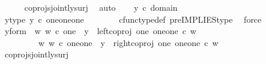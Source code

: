 \begin{isabellebody}
\ \ \ \ \isamarkupfalse%
\ coprojs{\isacharunderscore}{\kern0pt}jointly{\isacharunderscore}{\kern0pt}surj\ \isamarkupfalse%
\ auto\isanewline
\isanewline
\ \ \isamarkupfalse%
\ {\isachardoublequoteopen}y\ {\isasymin}\isactrlsub c\ domain\ {\isacharparenleft}{\kern0pt}{\isasymlangle}{\isasymt}{\isacharcomma}{\kern0pt}{\isasymt}{\isasymrangle}\ {\isasymamalg}\ {\isasymlangle}{\isasymf}{\isacharcomma}{\kern0pt}\ {\isasymf}{\isasymrangle}\ {\isasymamalg}\ {\isasymlangle}{\isasymf}{\isacharcomma}{\kern0pt}{\isasymt}{\isasymrangle}{\isacharparenright}{\kern0pt}{\isachardoublequoteclose}\ \isanewline
\ \ \isamarkupfalse%
\ \isamarkupfalse%
\ y{\isacharunderscore}{\kern0pt}type{\isacharcolon}{\kern0pt}\ {\isachardoublequoteopen}y\ {\isasymin}\isactrlsub c\ {\isacharparenleft}{\kern0pt}one{\isasymCoprod}{\isacharparenleft}{\kern0pt}one{\isasymCoprod}one{\isacharparenright}{\kern0pt}{\isacharparenright}{\kern0pt}{\isachardoublequoteclose}\ \ \isanewline
\ \ \ \ \isamarkupfalse%
\ cfunc{\isacharunderscore}{\kern0pt}type{\isacharunderscore}{\kern0pt}def\ pre{\isacharunderscore}{\kern0pt}IMPLIES{\isacharunderscore}{\kern0pt}type\ \isamarkupfalse%
\ force\isanewline
\ \ \isamarkupfalse%
\ \isamarkupfalse%
\ y{\isacharunderscore}{\kern0pt}form{\isacharcolon}{\kern0pt}\ {\isachardoublequoteopen}{\isacharparenleft}{\kern0pt}{\isasymexists}\ w{\isachardot}{\kern0pt}\ {\isacharparenleft}{\kern0pt}w\ {\isasymin}\isactrlsub c\ one\ {\isasymand}\ y\ {\isacharequal}{\kern0pt}\ {\isacharparenleft}{\kern0pt}left{\isacharunderscore}{\kern0pt}coproj\ one\ {\isacharparenleft}{\kern0pt}one{\isasymCoprod}one{\isacharparenright}{\kern0pt}{\isacharparenright}{\kern0pt}\ {\isasymcirc}\isactrlsub c\ w{\isacharparenright}{\kern0pt}{\isacharparenright}{\kern0pt}\isanewline
\ \ \ \ \ \ {\isasymor}\ \ {\isacharparenleft}{\kern0pt}{\isasymexists}\ w{\isachardot}{\kern0pt}\ {\isacharparenleft}{\kern0pt}w\ {\isasymin}\isactrlsub c\ {\isacharparenleft}{\kern0pt}one{\isasymCoprod}one{\isacharparenright}{\kern0pt}\ {\isasymand}\ y\ {\isacharequal}{\kern0pt}\ {\isacharparenleft}{\kern0pt}right{\isacharunderscore}{\kern0pt}coproj\ one\ {\isacharparenleft}{\kern0pt}one{\isasymCoprod}one{\isacharparenright}{\kern0pt}{\isacharparenright}{\kern0pt}\ {\isasymcirc}\isactrlsub c\ w{\isacharparenright}{\kern0pt}{\isacharparenright}{\kern0pt}{\isachardoublequoteclose}\isanewline
\ \ \ \ \isamarkupfalse%
\ coprojs{\isacharunderscore}{\kern0pt}jointly{\isacharunderscore}{\kern0pt}surj\ \isamarkupfalse%

\end{isabellebody}

